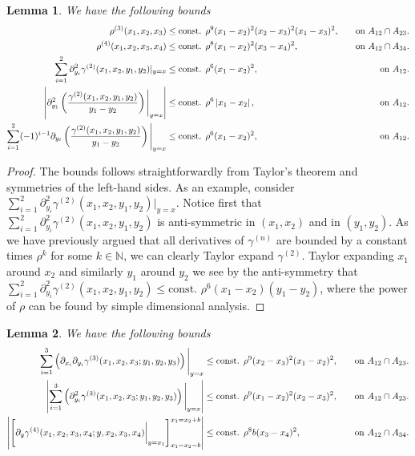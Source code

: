 \documentclass[a4paper,11pt]{article}
\newcommand{\abs}[1]{\left\lvert #1 \right\rvert}
\newtheorem{lemma}{Lemma}
\numberwithin{equation}{section}
\begin{document}
			\begin{lemma}\label{LemmaDensityBounds}
				We have the following bounds\begin{equation}
				\begin{aligned}
				\rho^{(3)}(x_1,x_2,x_3)&\leq \textnormal{const. }\rho^9(x_1-x_2)^2(x_2-x_3)^2(x_1-x_3)^2,\quad &\textnormal{on }A_{12}\cap A_{23}.\\
				\rho^{(4)}(x_1,x_2,x_3,x_4)&\leq \textnormal{const. }\rho^8(x_1-x_2)^2(x_3-x_4)^2,\quad &\textnormal{on }A_{12}\cap A_{34}.\\
				\sum_{i=1}^{2}\partial_{y_i}^2\gamma^{(2)}(x_1,x_2,y_1,y_2)\rvert_{y=x}&\leq \textnormal{const. } \rho^{6}(x_1-x_2)^2, &\textnormal{on }A_{12}.\\
				\abs{\partial_{y_1}^2\left(\frac{\gamma^{(2)}(x_1,x_2,y_1,y_2)}{y_1-y_2}\right)\Bigg\rvert_{y=x}}&\leq \textnormal{const. } \rho^{6}\abs{x_1-x_2}, &\textnormal{on }A_{12}.\\
				\sum_{i=1}^{2}(-1)^{i-1}\partial_{y_i}\left(\frac{\gamma^{(2)}(x_1,x_2,y_1,y_2)}{y_1-y_2}\right)\Bigg\rvert_{y=x}&\leq \textnormal{const. } \rho^{6}(x_1-x_2)^2, &\textnormal{on }A_{12}.
				\end{aligned}
				\end{equation}
			\end{lemma}
			\begin{proof}
				The bounds follows straightforwardly from Taylor's theorem and symmetries of the left-hand sides. As an example, consider $ \sum_{i=1}^{2}\partial_{y_i}^2\gamma^{(2)}(x_1,x_2,y_1,y_2)\rvert_{y=x} $. Notice first that $ \sum_{i=1}^{2}\partial_{y_i}^2\gamma^{(2)}(x_1,x_2,y_1,y_2) $ is anti-symmetric in $ (x_1,x_2) $ and in $ (y_1,y_2) $. As we have previously argued that all derivatives of $ \gamma^{(n)} $ are bounded by a constant times $ \rho^k $ for some $ k\in\mathbb{N} $, we can clearly Taylor expand $ \gamma^{(2)} $. Taylor expanding $ x_1 $ around $ x_2 $ and similarly $ y_1 $ around $ y_2 $ we see by the anti-symmetry that $ \sum_{i=1}^{2}\partial_{y_i}^2\gamma^{(2)}(x_1,x_2,y_1,y_2)\leq \text{const. }\rho^6(x_1-x_2)(y_1-y_2) $, where the power of $ \rho $ can be found by simple dimensional analysis.
			\end{proof}
			\begin{lemma} \label{LemmaDensityBounds2}
				We have the following bounds
				\begin{equation}
				\begin{aligned}
				\sum_{i=1}^{3}\left(\partial_{x_i}\partial_{y_i}\gamma^{(3)}(x_1,x_2,x_3;y_1,y_2,y_3)\right)\Bigg\vert_{y=x}&\leq \textnormal{const. }\rho^9(x_2-x_3)^2(x_1-x_2)^2,\quad &\textnormal{on }A_{12}\cap A_{23}.\\
				\abs{\sum_{i=1}^{3}\left(\partial_{y_i}^2\gamma^{(3)}(x_1,x_2,x_3;y_1,y_2,y_3)\right)\Bigg\vert_{y=x}}&\leq\textnormal{const. }\rho^9(x_1-x_2)^2(x_2-x_3)^2,\quad &\textnormal{on }A_{12}\cap A_{23}.\\
				\abs{\left[\partial_{y}\gamma^{(4)}(x_1,x_2,x_3,x_4;y,x_2,x_3,x_4)\bigg\vert_{y=x_1}\right]_{x_1=x_2-b}^{x_1=x_2+b}}&\leq \textnormal{const. }\rho^8b(x_3-x_4)^2 ,\quad &\textnormal{on }A_{12}\cap A_{34}.
				\end{aligned}
				\end{equation}
			\end{lemma}
\end{document}

